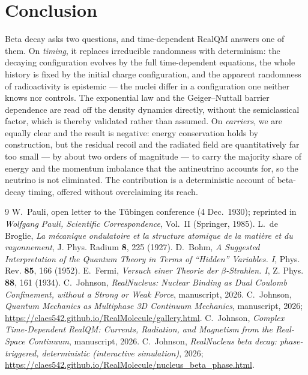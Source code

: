 \documentclass[11pt]{article}
\begin{document}
\section{Conclusion}
\label{sec:concl}

Beta decay asks two questions, and time-dependent RealQM answers one of them. On \emph{timing}, it replaces
irreducible randomness with determinism: the decaying configuration evolves by the full time-dependent
equations, the whole history is fixed by the initial charge configuration, and the apparent randomness of
radioactivity is epistemic --- the nuclei differ in a configuration one neither knows nor controls. The
exponential law and the Geiger--Nuttall barrier dependence are read off the density dynamics directly,
without the semiclassical factor, which is thereby validated rather than assumed. On \emph{carriers}, we are
equally clear and the result is negative: energy conservation holds by construction, but the residual recoil and the radiated
field are quantitatively far too small --- by about two orders of magnitude --- to carry the majority share
of energy and the momentum imbalance that the antineutrino accounts for, so the neutrino is not eliminated.
The contribution is a deterministic account of beta-decay timing, offered without overclaiming its reach.

\begin{thebibliography}{9}
 W.~Pauli, open letter to the Tübingen conference (4 Dec.\ 1930); reprinted in
\emph{Wolfgang Pauli, Scientific Correspondence}, Vol.~II (Springer, 1985).
 L.~de Broglie, \emph{La m\'ecanique ondulatoire et la structure atomique de la
mati\`ere et du rayonnement}, J. Phys. Radium \textbf{8}, 225 (1927).
 D.~Bohm, \emph{A Suggested Interpretation of the Quantum Theory in Terms of ``Hidden''
Variables. I}, Phys. Rev. \textbf{85}, 166 (1952).
 E.~Fermi, \emph{Versuch einer Theorie der $\beta$-Strahlen. I}, Z. Phys. \textbf{88},
161 (1934).
 C.~Johnson, \emph{RealNucleus: Nuclear Binding as Dual Coulomb Confinement, without a
Strong or Weak Force}, manuscript, 2026.
 C.~Johnson, \emph{Quantum Mechanics as Multiphase 3D Continuum Mechanics}, manuscript,
2026; \url{https://claes542.github.io/RealMolecule/gallery.html}.
 C.~Johnson, \emph{Complex Time-Dependent RealQM: Currents, Radiation, and Magnetism
from the Real-Space Continuum}, manuscript, 2026.
 C.~Johnson, \emph{RealNucleus beta decay: phase-triggered, deterministic (interactive
simulation)}, 2026; \url{https://claes542.github.io/RealMolecule/nucleus_beta_phase.html}.
\end{thebibliography}
\end{document}

